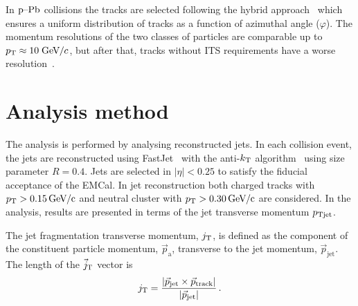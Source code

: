 In $\mbox{p--Pb}$ collisions the tracks are selected following the hybrid approach~\cite{hybridExplanation} which ensures a uniform distribution of tracks as a function of azimuthal angle ($\varphi$). The momentum resolutions of the two classes of particles are comparable up to $p_{\rm T} \approx 10\;\mathrm{GeV}\kern-0.05em/\kern-0.02em c$, but after that, tracks without ITS requirements have a worse resolution~\cite{alicePerformance,aliceBackgroundFluctuation}.

\section{Analysis method}
\label{sec:methods}

The analysis is performed by analysing reconstructed jets. In each collision event, the jets are reconstructed using FastJet~\cite{fastjet} with the anti-$k_{\rm T}$ algorithm~\cite{antikt} using size parameter $R=0.4$. Jets are selected in $\left| \eta \right| < 0.25 $ to satisfy the fiducial acceptance of the EMCal. In jet reconstruction both charged tracks with $\pt{}>\unit[0.15]{\GeVc}$ and neutral cluster with $\pt{}>\unit[0.30]{\GeVc}$ are considered. In the analysis, results are presented in terms of the jet transverse momentum $p_{\rm Tjet}$.

The jet fragmentation transverse momentum, $j_{\rm T}$, is defined as the component of the constituent particle momentum, $\vec{p}_{\mathrm{a}}$, transverse to the jet momentum, $\vec{p}_{\mathrm{jet}}$.
The length of the $\vec{j}_{\rm T}$ vector is
  \begin{equation}
    j_{\rm T} = \frac{|\vec{p}_{\mathrm{jet}} \times \vec{p}_{\mathrm{track}}|}{|\vec{p}_{\mathrm{jet}}|} \,.
  \label{eq:jtdefinition}
  \end{equation}

